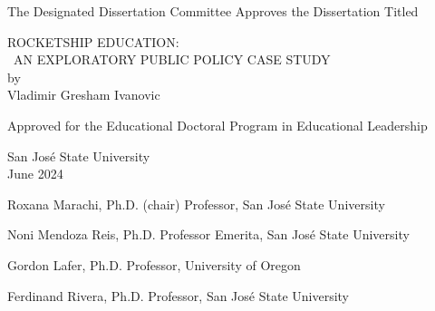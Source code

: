 
\begin{vplace}%
\OnehalfSpacing%
\begin{center}
The Designated Dissertation Committee Approves the Dissertation Titled\\
\vspace{2\baselineskip}

ROCKETSHIP EDUCATION:\\\vspace{1ex}
~AN EXPLORATORY PUBLIC POLICY CASE STUDY\\
by\\
Vladimir Gresham Ivanovic\\
\vspace{2\baselineskip}

Approved for the Educational Doctoral Program in Educational Leadership\\
\vspace{2\baselineskip}

San José State University\\
\vspace{2\baselineskip}
June 2024\\
\vspace{4\baselineskip}
\end{center}



Roxana Marachi, Ph.D. (chair)\hfill{} Professor, San José State University\\
\vspace{\baselineskip}

Noni Mendoza Reis, Ph.D.\hfill{} Professor Emerita, San José State University\\
\vspace{\baselineskip}

Gordon Lafer, Ph.D.\hfill{} Professor, University of Oregon
\vspace{\baselineskip}

Ferdinand Rivera, Ph.D.\hfill{} Professor, San José State University

\end{vplace}

\thispagestyle{empty}


